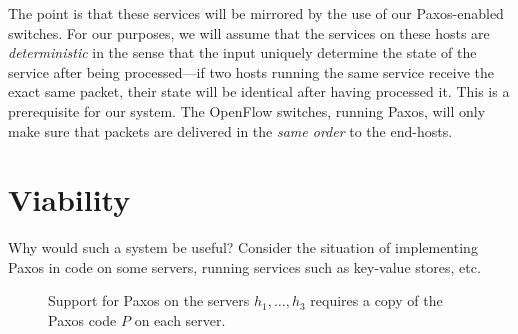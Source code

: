 The point is that these services will be mirrored by the use of our
Paxos-enabled switches.  For our purposes, we will assume that the services
on these hosts are \textit{deterministic}
in the sense that the input uniquely determine the
state of the service after being processed---if two hosts running the
same service receive the exact same packet, their state will be
identical after having processed it.  This is a prerequisite for our
system.  The OpenFlow switches, running Paxos, will only make sure that
packets are delivered in the \textit{same order} to the end-hosts.

\section{Viability}

Why would such a system be useful? Consider the situation of implementing
Paxos in code on some servers, running services such as key-value
stores, etc.

\begin{figure}[H]
  \centering
  \caption{Support for Paxos on the servers $h_1, \dots, h_3$ requires a
    copy of the Paxos code $P$ on each server.}
  \label{figure:paxos.on.servers}
\end{figure}

